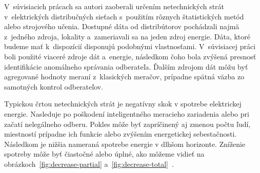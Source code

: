 \documentclass[a4paper,twoside,slovak,12pt,appendix]{article}
\begin{document}
V~súvisiacich prácach sa autori zaoberali určením netechnických strát
v~elektrických distribučných sieťach s~použitím rôznych štatistických metód
alebo strojového učenia. Dostupné dáta od distribútorov pochádzali najmä
z~jedného zdroja, lokality a~zameriavali sa na jeden zdroj energie. Dáta, ktoré
budeme mať k~dispozícií disponujú podobnými vlastnosťami. V~súvisiacej
práci~\cite{Coma-Puig2016} boli použité viaceré zdroje dát a~energie, následkom
čoho bola zvýšená presnosť identifikácie anomálneho správania odberateľa.
Ďalším zdrojom dát môžu byť agregované hodnoty meraní z~klasických meračov,
prípadne spätná väzba zo samotných kontrol odberateľov.

Typickou črtou netechnických strát je negatívny skok v spotrebe elektrickej
energie. Nasleduje po poškodení inteligentného meracieho zariadenia alebo pri
začatí nelegálneho odberu. Pokles môže byť zapríčinený aj zmenou počtu ľudí,
miestností prípadne ich funkcie alebo zvýšením energetickej sebestačnosti.
Následkom je nižšia nameraná spotrebe energie v dlhšom horizonte. Zníženie
spotreby môže byť čiastočné alebo úplné, ako môžeme
vidieť na obrázkoch~\ref{fig:decrease-partial}
a~\ref{fig:decrease-total}~\cite{Spiric2015,Trevizan2015}.
\end{document}
